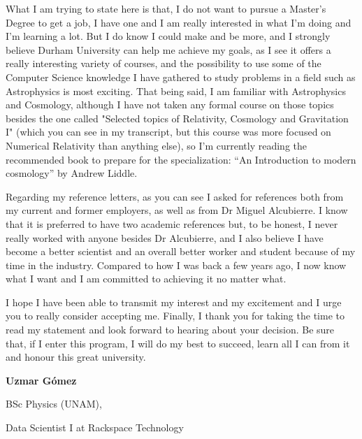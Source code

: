 \documentclass{article}
\begin{document}
What I am trying to state here is that, I do not want to pursue a Master's Degree to get a job, I have one and I am really interested in what I'm doing and I'm learning a lot. But I do know I could make and be more, and I strongly believe Durham University can help me achieve my goals, as I see it offers a really interesting variety of courses, and the possibility to use some of the Computer Science knowledge I have gathered to study problems in a field such as Astrophysics is most exciting. That being said, I am familiar with Astrophysics and Cosmology, although I have not taken any formal course on those topics besides the one called "Selected topics of Relativity, Cosmology and Gravitation I" (which you can see in my transcript, but this course was more focused on Numerical Relativity than anything else), so I'm currently reading the recommended book to prepare for the specialization: ``An Introduction to modern cosmology'' by Andrew Liddle.

Regarding my reference letters, as you can see I asked for references both from my current and former employers, as well as from Dr Miguel Alcubierre. I know that it is preferred to have two academic references but, to be honest, I never really worked with anyone besides Dr Alcubierre, and I also believe I have become a better scientist and an overall better worker and student because of my time in the industry. Compared to how I was back a few years ago, I now know what I want and I am committed to achieving it no matter what.

I hope I have been able to transmit my interest and my excitement and I urge you to really consider accepting me. Finally, I thank you for taking the time to read my statement and look forward to hearing about your decision. Be sure that, if I enter this program, I will do my best to succeed, learn all I can from it and honour this great university.

\vspace{4cm}
\hfill \textbf{Uzmar Gómez}

\hfill BSc Physics (UNAM), 

\hfill Data Scientist I at Rackspace Technology
\end{document}
